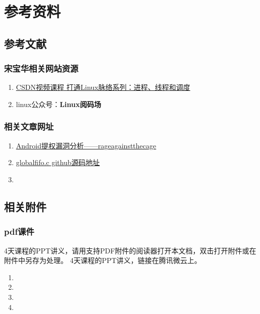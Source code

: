 \partabstractfp{}
\part{参考资料}
\chapter{参考文献}
\section{宋宝华相关网站资源}
\begin{enumerate}
  \item \href{https://edu.csdn.net/course/detail/5995}{CSDN视频课程 打通Linux脉络系列：进程、线程和调度}
  \item linux公众号：\textbf{Linux阅码场}
\end{enumerate}

\section{相关文章网址}
\begin{enumerate}
  \item \href{https://blog.csdn.net/feglass/article/details/46403501}{Android提权漏洞分析——rageagainstthecage}
  \item \href{https://github.com/21cnbao/training/blob/master/kernel/drivers/globalfifo/ch12/globalfifo.c}{globalfifo.c github源码地址}
  \item 
\end{enumerate}

\chapter{相关附件}
\section{pdf课件}
\ifattachpdffile
4天课程的PPT讲义，请用支持PDF附件的阅读器打开本文档，双击打开附件或在附件中另存为处理。
\else
4天课程的PPT讲义，链接在腾讯微云上。
\fi
\begin{enumerate}
  \item {}
  \item {}
  \item {}
  \item {}
\end{enumerate}



